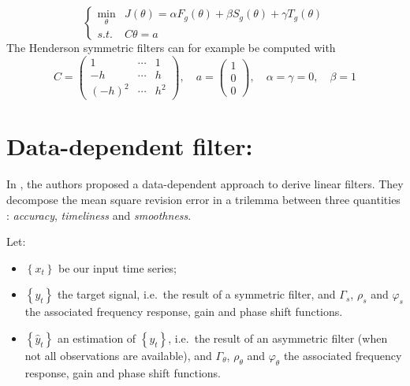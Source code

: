 \documentclass[
  12pt,
  ,
  a4paper]{article}
\newcommand\1{\mathds{1}}
\begin{document}
\[
\begin{cases}
\underset{\theta}{\min} & J(\theta)=
\alpha F_g(\theta)+\beta S_g(\theta)+\gamma T_g(\theta)\\
s.t. & C\theta=a
\end{cases}
\]
The Henderson symmetric filters can for example be computed with
\[C=\begin{pmatrix}
1 & \cdots&1\\
-h & \cdots&h \\
(-h)^2 & \cdots&h^2
\end{pmatrix},\quad
a=\begin{pmatrix}
1 \\0\\0
\end{pmatrix},\quad
\alpha=\gamma=0,\quad
\beta=1\]

\hypertarget{sec:WildiMcLeroy}{%
\section{\texorpdfstring{Data-dependent filter: \textcite{trilemmaWMR2019}}{Data-dependent filter: @trilemmaWMR2019}}\label{sec:WildiMcLeroy}}

In \textcite{trilemmaWMR2019}, the authors proposed a data-dependent approach to derive linear filters. They decompose the mean square revision error in a trilemma between three quantities : \emph{accuracy}, \emph{timeliness} and \emph{smoothness}.

Let:

\begin{itemize}
\item
  \(\left\{ x_{t}\right\}\) be our input time series;
\item
  \(\left\{y_{t}\right\}\) the target signal, i.e.~the result of a symmetric filter, and \(\Gamma_s\), \(\rho_s\) and \(\varphi_s\) the associated frequency response, gain and phase shift functions.
\item
  \(\left\{\hat y_{t}\right\}\) an estimation of \(\left\{y_{t}\right\}\), i.e.~the result of an asymmetric filter (when not all observations are available), and \(\Gamma_\theta\), \(\rho_\theta\) and \(\varphi_\theta\) the associated frequency response, gain and phase shift functions.
\end{itemize}
\end{document}
